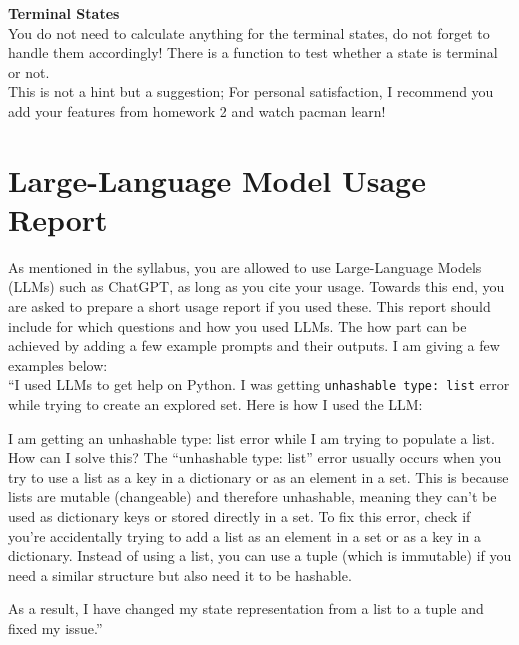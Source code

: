 \documentclass{article}
\begin{document}
\noindent\textbf{Terminal States} \\
You do not need to calculate anything for the terminal states, do not forget to handle them accordingly! There is a function to test whether a state is
terminal or not. \\




\noindent
This is not a hint but a suggestion; For personal satisfaction, I recommend you add your features from homework 2 and watch pacman learn! 

\section*{Large-Language Model Usage Report}
As mentioned in the syllabus, you are allowed to use Large-Language Models (LLMs) such as ChatGPT, as long as you cite your usage. Towards this end,
you are asked to prepare a short usage report if you used these. This report should include for which questions and how you used LLMs. 
The how part can be achieved by adding a few example prompts and their outputs. I am giving a few examples below:\\

``I used LLMs to get help on Python. I was getting \texttt{unhashable type: \textquotesingle list\textquotesingle} error while 
trying to create an explored set. Here is how I used the LLM: 
\begin{dialogue}
 I am getting an unhashable type: list error while I am trying to populate a list. How can I solve this?
 The ``unhashable type: list'' error usually occurs when you try to use a list as a key in a dictionary or as an element in a set. 
This is because lists are mutable (changeable) and therefore unhashable, meaning they can't be used as dictionary keys or stored directly in a set. 
To fix this error, check if you're accidentally trying to add a list as an element in a set or as a key in a dictionary. Instead of using a list, 
you can use a tuple (which is immutable) if you need a similar structure but also need it to be hashable.
\end{dialogue}
As a result, I have changed my state representation from a list to a tuple and fixed my issue.'' \\
\end{document}
